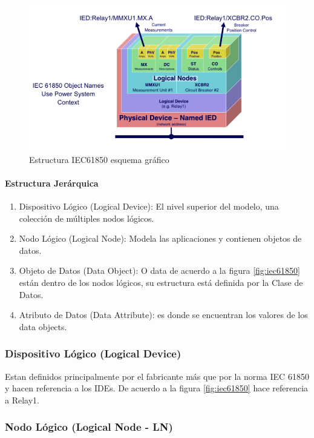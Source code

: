 \documentclass[a5paper]{book}%
\begin{document}
\begin{figure}[H]
  \centering
  \caption{Estructura IEC61850 esquema gráfico}
  \label{fig:iec61850_ln}
  \includegraphics[width=0.7\linewidth]{LNs}
\end{figure}

\paragraph{Estructura Jerárquica}

\begin{enumerate}
\item     Dispositivo Lógico (Logical Device): El nivel superior del modelo, una colección de múltiples nodos lógicos.
    
\item Nodo Lógico (Logical Node): Modela las  aplicaciones y contienen objetos de datos.
    
\item Objeto de Datos (Data Object): O data de acuerdo a la figura \ref{fig:iec61850} están dentro de los nodos lógicos, su estructura está definida por la Clase de Datos.
    
\item Atributo de Datos (Data Attribute): es donde se encuentran los valores de los data objects.
  \end{enumerate}

\subsubsection{ Dispositivo Lógico (Logical Device)}

Estan definidos principalmente por el fabricante más que por la norma IEC 61850 y hacen referencia a los IDEs. De acuerdo a la figura \ref{fig:iec61850} hace referencia a Relay1.

\subsubsection{Nodo Lógico (Logical Node - LN)}
\end{document}

